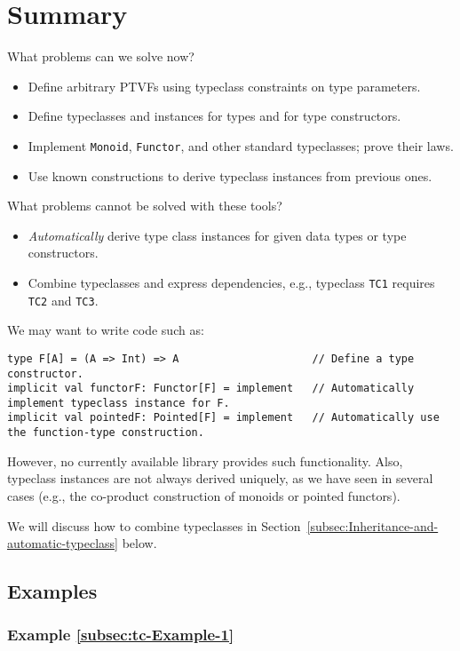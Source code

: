 \section{Summary}

What problems can we solve now?
\begin{itemize}
\item Define arbitrary PTVFs using typeclass constraints on type parameters.
\item Define typeclasses and instances for types and for type constructors.
\item Implement \lstinline!Monoid!, \lstinline!Functor!, and other standard
typeclasses; prove their laws.
\item Use known constructions to derive typeclass instances from previous
ones.
\end{itemize}
What problems cannot be solved with these tools?
\begin{itemize}
\item \emph{Automatically} derive type class instances for given data types
or type constructors.
\item Combine typeclasses and express dependencies, e.g., typeclass \lstinline!TC1!
requires \lstinline!TC2! and \lstinline!TC3!.
\end{itemize}
We may want to write code such as:
\begin{lstlisting}
type F[A] = (A => Int) => A                     // Define a type constructor.
implicit val functorF: Functor[F] = implement   // Automatically implement typeclass instance for F.
implicit val pointedF: Pointed[F] = implement   // Automatically use the function-type construction.
\end{lstlisting}
However, no currently available library provides such functionality.
Also, typeclass instances are not always derived uniquely, as we have
seen in several cases (e.g., the co-product construction of monoids
or pointed functors).

We will discuss how to combine typeclasses in Section~\ref{subsec:Inheritance-and-automatic-typeclass}
below.

\subsection{Examples}

\subsubsection{Example \label{subsec:tc-Example-1}\ref{subsec:tc-Example-1}}

